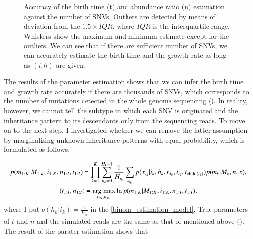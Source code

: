 \documentclass{article}
\begin{document}
\begin{figure}[H]
   \caption{
 Accuracy of the birth time (t) and abundance ratio (n) estimation against the number of SNVs. Outliers are detected by means of deviation from the $1.5 \times IQR$, where $IQR$ is the interquartile range. Whiskers show the maximum and minimum estimate except for the outliers. We can see that if there are sufficient number of SNVs, we can accurately estimate the birth time and the growth rate as long as $(i,h)$ are given.
  }
 \label{fig: binom_subtype_inheritance}
\end{figure}

The results of the parameter estimation shows that we can infer the birth time and growth rate accurately if there are thousands of SNVs, which corresponds to the number of mutations detected in the whole genome sequencing ().
In reality, however, we cannot tell the subtype in which each SNV is originated and the inheritance pattern to its descendants only from the sequencing reads.
To move on to the next step, I investigated whether we can remove the latter assumption by marginalizing unknown inheritance patterns with equal probability, which is formulated as follows,

\begin{gather}
 p(m_{1:K}|M_{1:K}, i_{1:K}, n_{1:I}, t_{1:I}) = \prod_{k=1}^{K} \sum_{h_k=0}^{H_k-1} \frac{1}{H_{i_k}} \sum_{x_{i_k}} p(x_{i_k} | i_k, h_k, n_{i_k}, t_{i_k}, t_{\mathrm{child}(i_k)}) p (m_k | M_k, n, x),\\
 (t_{1:I}, n_{1:I}) = \mathop{\rm arg~max}\limits_{t_{1:I}, n_{1:I}} \ln p(m_{1:K} | M_{1:K}, i_{1:K}, n_{1:I}, t_{1:I}),
\end{gather}
where I put $p(h_k | i_k) = \frac{1}{H_{i_k}}$ in the \eqref{binom_estimation_model}.
True parameters of $t$ and $n$ and the simulated reads are the same as that of mentioned above ().
The result of the parater estimation shows that
\end{document}
